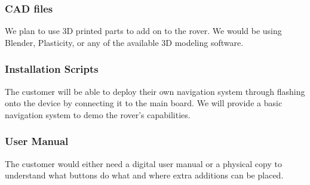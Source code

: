 \subsubsection{CAD files}
We plan to use 3D printed parts to add on to the rover. We would be using Blender, Plasticity, or any of the available 3D modeling software.

\subsubsection{Installation Scripts}
The customer will be able to deploy their own navigation system through flashing onto the device by connecting it to the main board. We will provide a basic navigation system to demo the rover's capabilities.

\subsubsection{ User Manual}
The customer would either need a digital user manual or a physical copy to understand what buttons do what and where extra additions can be placed. 
